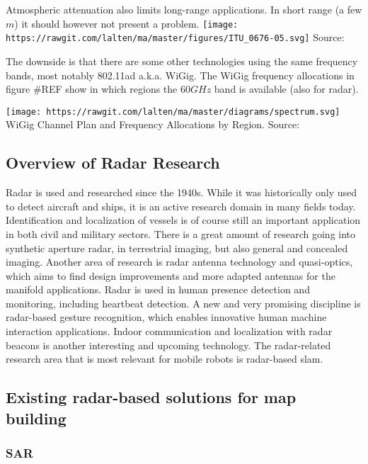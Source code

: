 Atmospheric attenuation also limits long-range applications. In short
range (a few \(m\)) it should however not present a problem.
\texttt{[image: https://rawgit.com/lalten/ma/master/figures/ITU\_0676-05.svg]}
Source: \cite{ITU1997}

The downside is that there are some other technologies using the same
frequency bands, most notably 802.11ad a.k.a.
WiGig\cite{AgilentTechnologies2013}. The WiGig frequency allocations in
figure \#REF show in which regions the \(60GHz\) band is available (also
for radar).

\texttt{[image: https://rawgit.com/lalten/ma/master/diagrams/spectrum.svg]}
WiGig Channel Plan and Frequency Allocations by Region. Source:
\cite{AgilentTechnologies2013}

\subsection{Overview of Radar
Research}\label{overview-of-radar-research}

Radar is used and researched since the 1940s. While it was historically
only used to detect aircraft and ships, it is an active research domain
in many fields today. Identification and localization of vessels is of
course still an important application in both civil and military
sectors. There is a great amount of research going into synthetic
aperture radar, in terrestrial imaging, but also general and concealed
imaging. Another area of research is radar antenna technology and
quasi-optics, which aims to find design improvements and more adapted
antennas for the manifold applications. Radar is used in human presence
detection and monitoring, including heartbeat detection. A new and very
promising discipline is radar-based gesture recognition, which enables
innovative human machine interaction applications. Indoor communication
and localization with radar beacons is another interesting and upcoming
technology. The radar-related research area that is most relevant for
mobile robots is radar-based slam.

\subsection{Existing radar-based solutions for map
building}\label{existing-radar-based-solutions-for-map-building}

\subsubsection{SAR}\label{sar}

